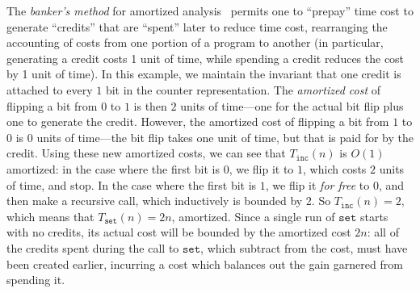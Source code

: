 The \emph{banker's method}
for amortized analysis~\cite{tarjan:amortized-complexity}
permits one to ``prepay'' time
cost to generate ``credits'' that are ``spent'' later to reduce time
cost, rearranging the accounting of costs from one portion of a program
to another (in particular, generating a credit costs 1 unit of time,
while spending a credit reduces the cost by 1 unit of time).  In this
example, we maintain the invariant that one credit is attached to every $1$ bit in
the counter representation.  The \emph{amortized cost} of flipping a bit
from $0$ to $1$ is then $2$ units of time---one for the actual bit flip
plus one to generate the credit. However, the amortized cost of flipping
a bit from $1$ to $0$ is $0$ units of time---the bit flip takes one unit
of time, but that is paid for by the credit.  Using these new amortized
costs, we can see that $T_{\texttt{inc}}(n)$ is $O(1)$ amortized: in the
case where the first bit is $0$, we flip it to $1$, which costs $2$
units of time, and stop. In the case where the first bit is $1$, we flip
it \emph{for free} to $0$, and then make a recursive call, which
inductively is bounded by 2. So $T_{\texttt{inc}}(n) = 2$, which means
that $T_{\texttt{set}}(n) = 2n$, amortized. Since a single run of
$\texttt{set}$ starts with no credits, its actual cost will be bounded
by the amortized cost $2n$: all of the credits spent during the call to
$\texttt{set}$, which subtract from the cost, must have been created
earlier, incurring a cost which balances out the gain garnered from
spending it.


